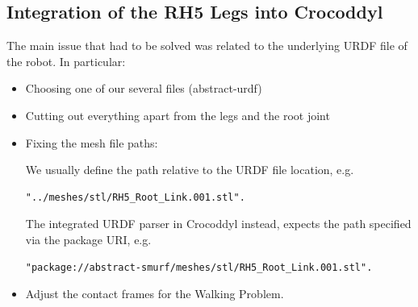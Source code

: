 \subsection{Integration of the RH5 Legs into Crocoddyl}
The main issue that had to be solved was related to the underlying URDF file of the robot. In particular: 
\begin{itemize}
\item Choosing one of our several files (abstract-urdf)
\item Cutting out everything apart from the legs and the root joint
\item Fixing the mesh file paths: 

We usually define the path relative to the URDF file location, e.g.
\begin{verbatim}
"../meshes/stl/RH5_Root_Link.001.stl".
\end{verbatim}
The integrated URDF parser in Crocoddyl instead, expects the path specified via the package URI, e.g. 
\begin{verbatim}
"package://abstract-smurf/meshes/stl/RH5_Root_Link.001.stl".
\end{verbatim}
\item Adjust the contact frames for the Walking Problem.
\end{itemize}


